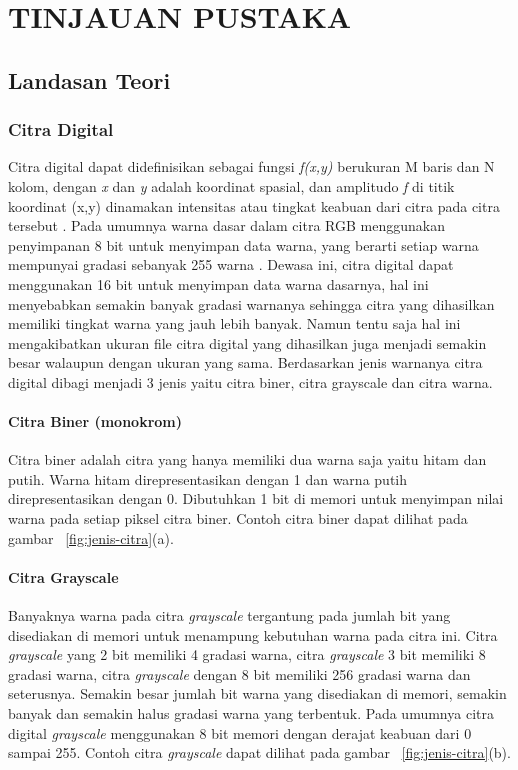 
\chapter{TINJAUAN PUSTAKA}


\section{Landasan Teori}

\subsection{Citra Digital}
Citra digital dapat didefinisikan sebagai fungsi \textit{f(x,y)} berukuran M baris dan N kolom, dengan \textit{x} dan \textit{y} adalah koordinat spasial, dan amplitudo \textit{f} di titik koordinat (x,y) dinamakan intensitas atau tingkat keabuan dari citra pada citra tersebut \cite{book:darma}. Pada umumnya warna dasar dalam citra RGB menggunakan penyimpanan 8 bit untuk menyimpan data warna, yang berarti setiap warna mempunyai gradasi sebanyak 255 warna . Dewasa ini, citra digital dapat menggunakan 16 bit untuk menyimpan data warna dasarnya, hal ini menyebabkan semakin banyak gradasi warnanya sehingga citra yang dihasilkan memiliki tingkat warna yang jauh lebih banyak. Namun tentu saja hal ini mengakibatkan ukuran file citra digital yang dihasilkan juga menjadi semakin besar walaupun dengan ukuran yang sama. Berdasarkan jenis warnanya citra digital dibagi menjadi 3 jenis yaitu citra biner, citra grayscale dan citra warna.

\subsubsection{Citra Biner (monokrom)} 
Citra biner adalah citra yang hanya memiliki dua warna saja yaitu hitam dan putih. Warna hitam direpresentasikan dengan 1 dan warna putih direpresentasikan dengan 0. Dibutuhkan 1 bit di memori untuk menyimpan nilai warna pada setiap piksel citra biner. Contoh citra biner dapat dilihat pada gambar ~\ref{fig:jenis-citra}(a).

\subsubsection{Citra Grayscale}
Banyaknya warna pada citra \textit{grayscale} tergantung pada jumlah bit yang disediakan di memori untuk menampung kebutuhan warna pada citra ini. Citra \textit{grayscale} yang 2 bit memiliki 4 gradasi warna, citra \textit{grayscale} 3 bit memiliki 8 gradasi warna, citra \textit{grayscale} dengan 8 bit memiliki 256 gradasi warna dan seterusnya. Semakin besar jumlah bit warna yang disediakan di memori, semakin banyak dan semakin halus gradasi warna yang terbentuk. Pada umumnya citra digital \textit{grayscale} menggunakan 8 bit memori dengan derajat keabuan dari 0 sampai 255. Contoh citra \textit{grayscale} dapat dilihat pada gambar ~\ref{fig:jenis-citra}(b).


